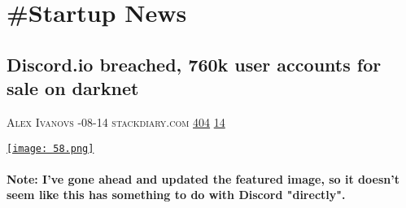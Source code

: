 \documentclass[10pt,a4paper]{article}
\begin{document}
\newpage
\section{\#Startup News}

\begin{multicols*}{2}

\noindent\begin{minipage}{\linewidth}
\subsection{Discord.io breached, 760k user accounts for sale on darknet}
\textsc{\footnotesize
{\scriptsize\faUser}\space 
Alex Ivanovs 
{\scriptsize\faCalendar}-08-14 
{\scriptsize\faGlobe}\space 
stackdiary.com 
{\scriptsize\faThumbsOUp}\space 
\href{http://news.ycombinator.com/item?id=37124187\&utm\_term=comment}{404} 
{\scriptsize\faComments}\space 
\href{http://news.ycombinator.com/item?id=37124187\&utm\_term=comment}{14} 
}
\par\medskip\noindent
\href{https://stackdiary.com/the-data-of-760000-discord-io-users-was-put-up-for-sale-on-the-darknet/?utm\_source=hackernewsletter\&utm\_medium=email\&utm\_term=startup\_news}{
    \texttt{[image: 58.png]}
}
\end{minipage}
\paragraph{}
\textbf{Note: I've gone ahead and updated the featured image, so it doesn't seem like this has something to do with Discord "directly".}

\end{multicols*}
\end{document}
